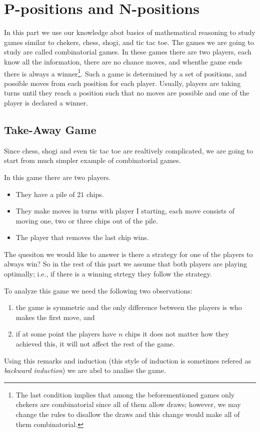 \chapter{P-positions and N-positions}
In this part we use our knowledge abot basics of mathematical reasoning
to study games similar to chekers, chess, shogi, and tic tac toe. The games we
are going to study are called combinatorial games. In these games there are two
players, each know all the information, there are no chance moves, and whenthe game ends there is always a winner\footnote{%
  The last condition implies that among the beforementioned games only chekers
  are combinatorial since all of them allow draws; however, we may change the
  rules to disallow the draws and this change would make all of them
  combinatorial.
}. Such a game is determined by a set of positions, and possible moves
from each position for each player. Usually, players are taking turns until
they reach a position such that no moves are possible and one of the player is
declared a winner.

\section{Take-Away Game}

Since chess, shogi and even tic tac toe are realtively complicated,
we are going to start from much simpler example of combinatorial games.
\begin{game}
\label{game:take-away-21-3-2-1}
  In this game there are two players.
  \begin{itemize}
    \item They have a pile of $21$ chips.
    \item They make moves in turns with player I starting,
      each move consists of moving one, two or three chips out of the pile.
    \item The player that removes the last chip wins.
  \end{itemize}
\end{game}
The quesiton we would like to answer is there a strategy for one of the players
to always win? So in the rest of this part we assume that both players are
playing optimally; i.e., if there is a winning strtegy they follow the strategy.

To analyze this game we need the following two observations:
\begin{enumerate}
  \item the game is symmetric and the only difference between the players is
    who makes the first move, and
  \item if at some point the players have $n$ chips it does not matter how they
    achieved this, it will not affect the rest of the game.
\end{enumerate}
Using this remarks and induction (this style of induction is sometimes
refered as \emph{backward induction}) we are abel to analise the game.


